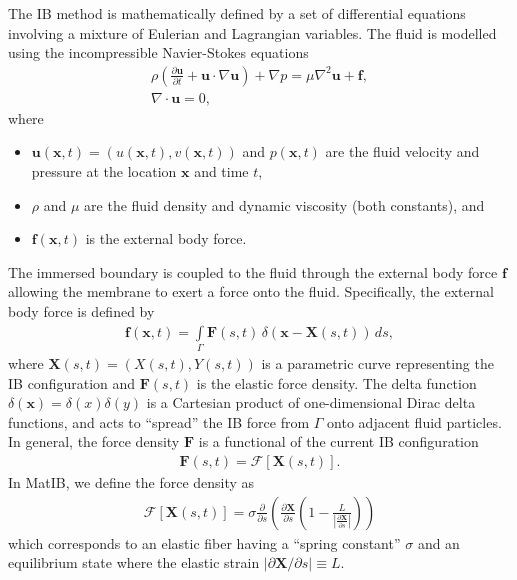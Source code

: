 \documentclass{article}
\newcommand{\Laplacian}{\nabla^2}
\newcommand{\bs}[1]{\boldsymbol{#1}}
\newcommand{\brac}[1]{\left(#1 \right)}
\newcommand{\pd}[2]{\frac{\partial #1}{\partial #2}}
\newcommand{\eqmstrain}{L}
\begin{document}
The IB method is mathematically defined by a set of differential equations involving a mixture of Eulerian and Lagrangian variables.
The fluid is modelled using the incompressible Navier-Stokes equations
\begin{gather}
  \label{eq:NSE}
  \rho \brac{\pd{\bs{u}}{t} + \bs{u}\cdot\nabla\bs{u}} + \nabla p = \mu 
  \Laplacian \bs{u} + \bs{f}, 
  \\
  \label{eq:incompressible}
  \nabla \cdot \bs{u} = 0,
\end{gather}
where 
\begin{itemize}
\item $\bs{u}(\bs{x},t)=(u(\bs{x},t),v(\bs{x},t))$ and $p(\bs{x},t)$ are the fluid velocity and pressure at the location $\bs{x}$ and time $t$,
\item $\rho$ and $\mu$ are the fluid density and dynamic viscosity (both constants), and
\item $\bs{f}(\bs{x},t)$ is the external body force.
\end{itemize}
The immersed boundary is coupled to the fluid through the external body force $\bs{f}$ allowing the membrane to exert a force onto the fluid.
Specifically, the external body force is defined by
\begin{gather}
  \label{eq:force}
  \bs{f}(\bs{x},t) = \int\limits_\Gamma \bs{F}(s,t) \, \delta(\bs{x} -
  \bs{X}(s,t)) \,ds, 
\end{gather}
where $\bs{X}(s,t)=(X(s,t), Y(s,t))$ is a parametric curve representing the IB configuration and 
$\bs{F}(s,t)$ is the elastic force density. The delta function $\delta(\bs{x}) = \delta(x)\delta(y)$ 
is a Cartesian product of one-dimensional Dirac delta functions, and acts to ``spread'' the IB
force from $\Gamma$ onto adjacent fluid particles. In general, the
force density $\bs{F}$ is a functional of the current IB configuration
\begin{gather}
  \label{eq:forceDensity}
  \bs{F}(s,t) = \bs{\mathcal{F}} \left[\bs{X}(s,t)\right].
\end{gather}
In MatIB, we define the force density as
\begin{gather}
  \label{eq:forceDensityDefinition}
  \bs{\mathcal{F}}[\bs{X}(s,t)] = \sigma \pd{ }{s}\brac{\pd{\bs{X}}{s}
    \brac{ 1 - \frac{\eqmstrain}{|\pd{\bs{X}}{s}|} }} 
\end{gather}
which corresponds to an elastic fiber having a ``spring constant''
$\sigma$ and an equilibrium state where the elastic strain $|\partial
\bs{X} / \partial s| \equiv \eqmstrain$.
\end{document}
